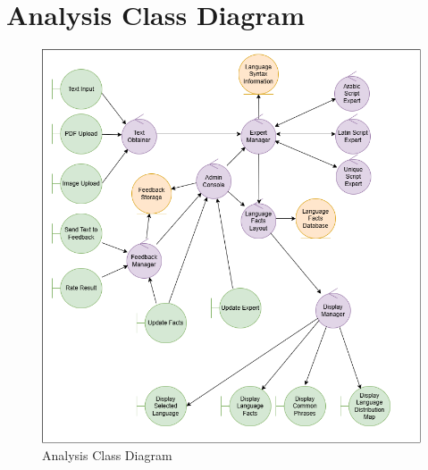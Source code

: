 \section{Analysis Class Diagram}
\label{sec:overall_description}



\begin{figure}[H]
	\centering
	\includegraphics[width=\linewidth]{Section2/class_diagramV4.png}
	\caption{Analysis Class Diagram}
	\label{AnalysisClassDiagram}
\end{figure}


